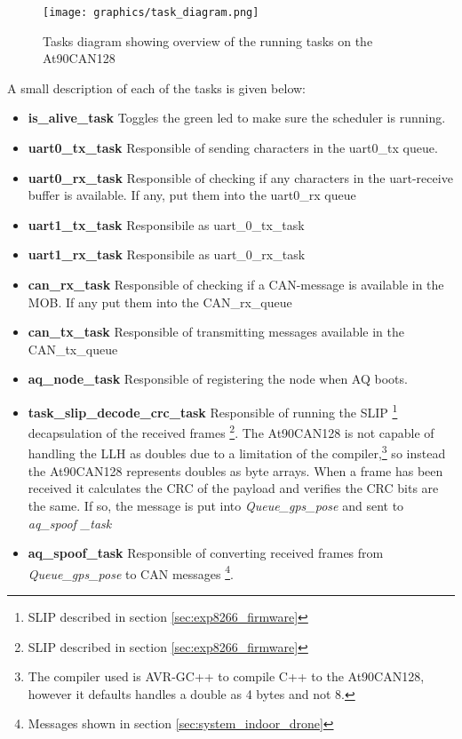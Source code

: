 \begin{figure}[H]
    \center
    \texttt{[image: graphics/task\_diagram.png]}
  \caption{Tasks diagram showing overview of the running tasks on the At90CAN128}
    \label{fig:task_diagram_atmega}
\end{figure}
A small description of each of the tasks is given below:
\begin{itemize}
\item \textbf{ is\_alive\_task} Toggles the green led to make sure the scheduler is running.
\item \textbf{ uart0\_tx\_task} Responsible of sending characters in the uart0\_tx queue.
\item \textbf{ uart0\_rx\_task} Responsible of checking if any characters in the uart-receive buffer is available. If any, put them into the uart0\_rx queue
\item \textbf{ uart1\_tx\_task} Responsibile as uart\_0\_tx\_task
\item \textbf{ uart1\_rx\_task} Responsibile as uart\_0\_rx\_task
\item \textbf{ can\_rx\_task} Responsible of checking if a CAN-message is available in the MOB. If any put them into the CAN\_rx\_queue
\item \textbf{ can\_tx\_task} Responsible of transmitting messages available in the CAN\_tx\_queue
\item \textbf{ aq\_node\_task} Responsible of registering the node when AQ boots.
\item \textbf{ task\_slip\_decode\_crc\_task} Responsible of running the SLIP \footnote{SLIP described in section \ref{sec:exp8266_firmware}} decapsulation of the received frames \footnote{SLIP described in section \ref{sec:exp8266_firmware}}. The At90CAN128 is not capable of handling the \ac{LLH} as doubles due to a limitation of the compiler,\footnote{The compiler used is AVR-GC++ to compile C++ to the At90CAN128, however it defaults handles a double as 4 bytes and not 8.} so instead the At90CAN128 represents doubles as byte arrays.
When a frame has been received it calculates the CRC of the payload and verifies the CRC bits are the same.
If so, the message is put into \textit{Queue\_gps\_pose} and sent to \textit{aq\_spoof \_task}
\item \textbf{ aq\_spoof\_task} Responsible of converting  received frames from \textit{Queue\_gps\_pose} to CAN messages \footnote{Messages shown in section \ref{sec:system_indoor_drone}}.
\end{itemize}

